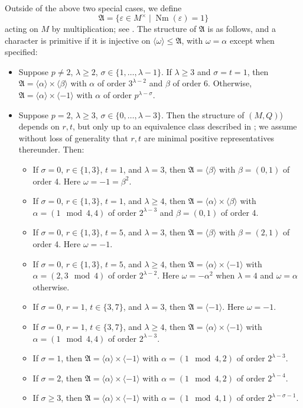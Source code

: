 \documentclass[a4paper,11pt]{report}
\begin{document}
{{{ Outside of the above two special cases, we define 
\[\mathfrak{A} = \{\varepsilon \in M^\times \mid \operatorname{Nm}(\varepsilon)
= 1 \}\]
 acting on $M$ by multiplication; see \cite[Section 2.3 - 2.4]{NW76}. The structure of $\mathfrak{A}$ is as follows, and a character is primitive if it is injective on $\langle\omega\rangle \leq \mathfrak{A}$, with $\omega = \alpha$ except when specified: 
\begin{itemize}
\item Suppose $p \neq 2$, $\lambda \geq 2$, $\sigma \in \{1, \dots, \lambda - 1\}$. If $\lambda \geq 3$ and $\sigma=t=1$, then $\mathfrak{A} = \langle\alpha\rangle \times \langle\beta\rangle$ with $\alpha$ of order $3^{\lambda-2}$ and $\beta$ of order 6. Otherwise, $\mathfrak{A} = \langle\alpha\rangle \times \langle-1\rangle$ with $\alpha$ of order $p^{\lambda - \sigma}$. 
\item Suppose $p=2$, $\lambda \geq 3$, $\sigma \in \{0, \dots, \lambda - 3\}$. Then the structure of $(M,Q)$) depends on $r,t$, but only up to an equivalence class described in \cite[Satz 4]{Nobs1}; we assume without loss of generality that $r,t$ are minimal positive representatives thereunder. Then: 
\begin{itemize}
\item If $\sigma = 0$, $r \in \{1,3\}$, $t=1$, and $\lambda = 3$, then $\mathfrak{A} = \langle\beta\rangle$ with $\beta = (0,1)$ of order 4. Here $\omega = -1 = \beta^2$.
\item If $\sigma = 0$, $r \in \{1,3\}$, $t=1$, and $\lambda \geq 4$, then $\mathfrak{A} = \langle\alpha\rangle \times \langle\beta\rangle$ with $\alpha = (1 \mod{4},4)$ of order $2^{\lambda-3}$ and $\beta = (0,1)$ of order 4.
\item If $\sigma = 0$, $r \in \{1,3\}$, $t=5$, and $\lambda = 3$, then $\mathfrak{A} = \langle\beta\rangle$ with $\beta = (2,1)$ of order 4. Here $\omega = -1$.
\item If $\sigma = 0$, $r \in \{1,3\}$, $t=5$, and $\lambda \geq 4$, then $\mathfrak{A} = \langle\alpha\rangle \times \langle-1\rangle$ with $\alpha = (2,3 \mod{4})$ of order $2^{\lambda-2}$. Here $\omega = -\alpha^2$ when $\lambda = 4$ and $\omega = \alpha$ otherwise.
\item If $\sigma = 0$, $r = 1$, $t \in \{3,7\}$, and $\lambda = 3$, then $\mathfrak{A} = \langle-1\rangle$. Here $\omega = -1$.
\item If $\sigma = 0$, $r = 1$, $t \in \{3,7\}$, and $\lambda \geq 4$, then $\mathfrak{A} = \langle\alpha\rangle \times \langle-1\rangle$ with $\alpha = (1 \mod{4},4)$ of order $2^{\lambda-3}$.
\item If $\sigma = 1$, then $\mathfrak{A} = \langle\alpha\rangle \times \langle-1\rangle$ with $\alpha = (1 \mod{4},2)$ of order $2^{\lambda-3}$.
\item If $\sigma = 2$, then $\mathfrak{A} = \langle\alpha\rangle \times \langle-1\rangle$ with $\alpha = (1 \mod{4},2)$ of order $2^{\lambda-4}$.
\item If $\sigma \geq 3$, then $\mathfrak{A} = \langle\alpha\rangle \times \langle-1\rangle$ with $\alpha = (1 \mod{4},1)$ of order $2^{\lambda-\sigma-1}$.
\end{itemize}
 

\end{itemize}}}}
\end{document}
